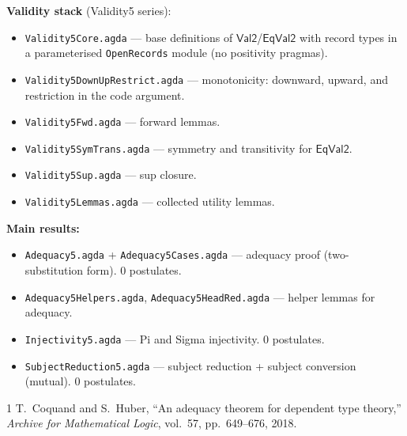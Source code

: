 \documentclass[11pt]{article}
\begin{document}
\medskip\noindent\textbf{Validity stack} (Validity5 series):
\begin{itemize}
  \item \texttt{Validity5Core.agda} --- base definitions of
    $\mathsf{Val2}$/$\mathsf{EqVal2}$ with record types in a
    parameterised \texttt{OpenRecords} module (no positivity pragmas).
  \item \texttt{Validity5DownUpRestrict.agda} --- monotonicity:
    downward, upward, and restriction in the code argument.
  \item \texttt{Validity5Fwd.agda} --- forward lemmas.
  \item \texttt{Validity5SymTrans.agda} --- symmetry and
    transitivity for $\mathsf{EqVal2}$.
  \item \texttt{Validity5Sup.agda} --- sup closure.
  \item \texttt{Validity5Lemmas.agda} --- collected utility lemmas.
\end{itemize}

\medskip\noindent\textbf{Main results:}
\begin{itemize}
  \item \texttt{Adequacy5.agda} + \texttt{Adequacy5Cases.agda} ---
    adequacy proof (two-substitution form).  0 postulates.
  \item \texttt{Adequacy5Helpers.agda},
    \texttt{Adequacy5HeadRed.agda} --- helper lemmas for adequacy.
  \item \texttt{Injectivity5.agda} --- Pi and Sigma injectivity.
    0 postulates.
  \item \texttt{SubjectReduction5.agda} --- subject reduction +
    subject conversion (mutual).  0 postulates.
\end{itemize}

\begin{thebibliography}{1}
  T.~Coquand and S.~Huber,
  ``An adequacy theorem for dependent type theory,''
  \emph{Archive for Mathematical Logic}, vol.~57, pp.~649--676, 2018.
\end{thebibliography}
\end{document}

